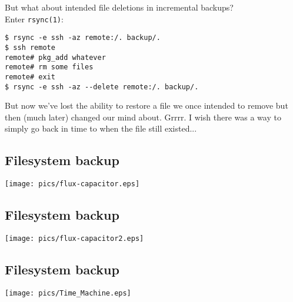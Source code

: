 \documentclass[xga]{xdvislides}
\begin{document}
But what about intended file deletions in incremental
backups? \\

Enter \verb+rsync(1)+: \\

\begin{verbatim}
$ rsync -e ssh -az remote:/. backup/.
$ ssh remote
remote# pkg_add whatever
remote# rm some files
remote# exit
$ rsync -e ssh -az --delete remote:/. backup/.
\end{verbatim}

But now we've lost the ability to restore a file we
once intended to remove but then (much later) changed
our mind about.  Grrrr.  I wish there was a way to
simply go back in time to when the file still
existed...

\subsection{Filesystem backup}
\vspace*{\fill}
\begin{center}
	\texttt{[image: pics/flux-capacitor.eps]}
\end{center}
\vspace*{\fill}

\subsection{Filesystem backup}
\vspace*{\fill}
\begin{center}
	\texttt{[image: pics/flux-capacitor2.eps]}
\end{center}
\vspace*{\fill}

\subsection{Filesystem backup}
\vspace*{\fill}
\begin{center}
	\texttt{[image: pics/Time\_Machine.eps]}
\end{center}
\vspace*{\fill}
\end{document}
